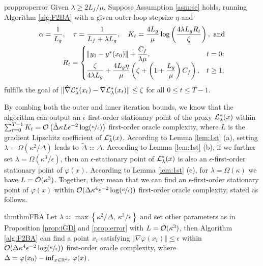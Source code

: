 \documentclass{article}
\begin{document}
\begin{restatable}{prop}{properror} \label{prop:error}
Given $\lambda \ge 2L_f / \mu$. Suppose Assumption \ref{asm:sc} holds, running Algorithm \ref{alg:F2BA} with a given outer-loop stepsize $\eta$ and 
\begin{align*}
    \alpha = \frac{1}{L_g}, \quad \tau = \frac{1}{L_f + \lambda L_g}, \quad K_t = \frac{4 L_g}{\mu} \log \left( 
    \frac{4 \lambda L_g R_t}{\zeta}
    \right), ~{\rm and} \\
R_t =
\begin{cases}
    \Vert y_0 - y^*(x_0) \Vert + \dfrac{C_f}{\lambda \mu}, & t=0; \\
    \dfrac{\zeta}{4 \lambda L_g} + \dfrac{4 L_g \eta }{\mu} \left( \zeta +   \left( 1 + \dfrac{L_g}{\mu}\right) C_f\right), & t \ge 1;
\end{cases}
\end{align*}
fulfills the goal of $ \Vert \hat \nabla {\mathcal{L}}_{\lambda}^*(x_t) - \nabla {\mathcal{L}}_{\lambda}^*(x_t) \Vert \le \zeta $ for all $0 \le t \le T-1$.
\end{restatable}

By combing both the outer and inner iteration bounds, we know that the algorithm can output an $\epsilon$-first-order stationary point of the proxy ${\mathcal{L}}_{\lambda}^*(x)$ within $\sum_{t=0}^{T-1} K_t= {\mathcal{O}}\left(\tilde \Delta \kappa L \epsilon^{-2} \log(\nicefrac{\kappa}{\epsilon})\right)$ first-order oracle complexity, where $L$ is the gradient Lipschitz coefficient of ${\mathcal{L}}_{\lambda}^*(x)$.
According to Lemma \ref{lem:1st} (a),
setting $\lambda = \Omega(\kappa^2 / \Delta)$ leads to $\tilde \Delta \asymp \Delta $. According to Lemma \ref{lem:1st} (b), if we further set $\lambda = \Omega( \kappa^3 / \epsilon )$, then an $\epsilon$-stationary point of ${\mathcal{L}}_{\lambda}^*(x)$ is also an $\epsilon$-first-order stationary point of $\varphi(x)$. According to Lemma \ref{lem:1st} (c), for $\lambda = \Omega(\kappa)$ we have $L = {\mathcal{O}}(\kappa^3)$. Together, they mean that we can find an $\epsilon$-first-order stationary point of $\varphi(x)$ within $ {\mathcal{O}}( \Delta \kappa^4 \epsilon^{-2} \log(\nicefrac{\kappa}{\epsilon}))$ first-order oracle complexity, stated as follows.

\begin{restatable}{thm}{thmFBA}\label{thm:F2BA}
Let $\lambda \asymp \max\left\{ \kappa^2/ \Delta, ~ \kappa^3 / \epsilon \right\} $
and set other parameters as in Proposition \ref{prop:iGD} and
 \ref{prop:error} with $L = {\mathcal{O}}(\kappa^3)$, then
Algorithm \ref{alg:F2BA} can find a point  $x_t$ satisfying $ \Vert \nabla \varphi(x_t) \Vert \le \epsilon $ within $ {\mathcal{O}}( \Delta \kappa^4 \epsilon^{-2} \log(\nicefrac{\kappa}{\epsilon})) $ first-order oracle complexity, where $\Delta = \varphi(x_0) - \inf_{x \in {\mathbb{R}}^{d_x}} \varphi(x)$.
\end{restatable}
\end{document}
